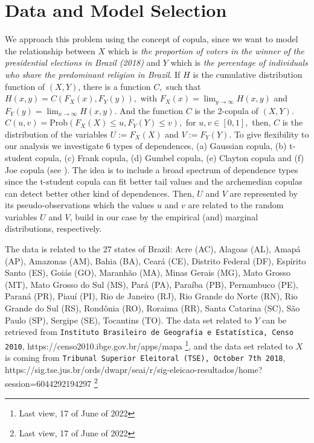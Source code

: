 \documentclass{aip-cp}
\begin{document}
\setcounter{section}{1}
\section{Data and Model Selection}\label{model}

We approach this problem using the concept of copula, since we want to model the relationship between $X$ which is {\it{the proportion of voters in the winner of the presidential elections in Brazil (2018)}} and $Y$ which is {\it{the percentage of individuals who share the predominant religion in Brazil}}. If $H$ is the cumulative distribution function of $(X,Y)$, there is a function $C,$ such that $H(x,y)=C(F_X(x), F_Y(y)), $  with $F_X(x)=\lim_{y \to \infty}H(x,y)$ and $F_Y(y)=\lim_{x \to \infty}H(x, y).$ And the function $C$ is the 2-copula of $(X,Y).$ $C(u,v)=\mbox{Prob}(F_X(X) \leq u, F_Y(Y) \leq v),$ for $u, v \in [0,1],$ then, $C$ is the distribution of the variables $U:=F_X(X)$ and $V:=F_Y(Y).$ To give flexibility to our analysis we investigate 6 types of dependences, (a) Gaussian copula, (b) t-student copula, (c) Frank copula, (d) Gumbel copula, (e) Clayton copula and (f) Joe copula (see \cite{nelsen}). The idea is to include a broad spectrum of dependence types since the t-student copula can fit better tail values and the archemedian copulas can detect better other kind of dependences. Then, $U$ and $V$ are represented by its pseudo-observations which the values $u$ and $v$ are related to the random variables $U$ and $V$, build in our case by the empirical (and) marginal distributions, respectively.

The data is related to the 27 states of Brazil:  Acre (AC), Alagoas (AL), Amapá (AP), Amazonas (AM), Bahia (BA),  Ceará (CE), Distrito Federal (DF), Espírito Santo (ES), Goiás (GO), Maranhão (MA), Minas Gerais (MG), Mato Grosso (MT), Mato Grosso do Sul (MS), Pará (PA), Paraíba (PB), Pernambuco (PE), Paraná (PR), Piauí (PI), Rio de Janeiro (RJ), Rio Grande do Norte (RN), Rio Grande do Sul (RS), Rondônia (RO), Roraima (RR), Santa Catarina (SC),  São Paulo (SP),  Sergipe (SE), Tocantins (TO). The data set related to $Y$ can be retrieved from {\texttt{Instituto Brasileiro de Geografia e Estatística, Censo 2010}}, https://censo2010.ibge.gov.br/apps/mapa \footnote{Last view, 17 of June of 2022}, and the data set related to $X$ is coming from {\texttt{Tribunal Superior Eleitoral (TSE), October 7th 2018}}, 
 https://sig.tse.jus.br/ords/dwapr/seai/r/sig-eleicao-resultados/home?session=6044292194297 \footnote{Last view, 17 of June of 2022}\\
\end{document}
